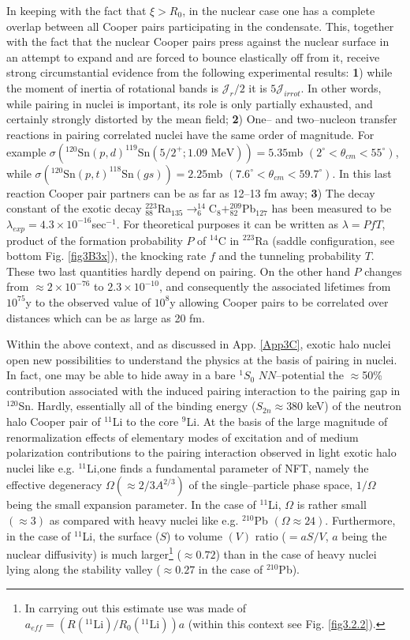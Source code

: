 \begin{subappendices}
 
 In keeping with the fact that $\xi>R_0$, in the nuclear case one has a complete overlap between all Cooper pairs participating in the condensate. This, together with the fact that the nuclear Cooper pairs press against the nuclear surface in an attempt to expand and are forced to bounce elastically off from  it, receive strong circumstantial evidence from the following experimental results: \textbf{1}) while the moment of inertia of rotational bands is $\mathcal J_r/2$ it is $5 \mathcal J_{irrot}$. In other words, while pairing in nuclei is important, its role is only partially exhausted, and certainly strongly distorted by the mean field; \textbf{2}) One-- and two--nucleon transfer reactions in pairing correlated nuclei have the same order of magnitude. For example $\sigma (^{120}\text{Sn}(p,d)^{119}\text{Sn}(5/2^+; 1.09 \text{ MeV}))=5.35 $mb $(2^\circ<\theta_{cm}<55^\circ)$, while $\sigma (^{120}\text{Sn}(p,t)^{118}\text{Sn}(gs))=2.25 $mb $(7.6^\circ<\theta_{cm}<59.7^\circ)$. In this last reaction Cooper pair partners can be as far as 12--13 fm away; \textbf{3}) The decay constant of the exotic decay $^{223}_{88}$Ra$_{135}\rightarrow^{14}_6$C$_8+^{209}_{82}$Pb$_{127}$ has been measured to be $\lambda_{exp}=4.3\times10^{-16}$sec$^{-1}$. For theoretical purposes it can be written as $\lambda=PfT$, product of the formation probability $P$ of $^{14}$C in $^{223}$Ra (saddle configuration, see bottom Fig. \ref{fig3B3x}), the knocking rate $f$ and the tunneling probability $T$. These two last quantities hardly depend on pairing. On the other hand $P$ changes from $\approx 2\times10^{-76}$ to $2.3\times10^{-10}$, and consequently the associated lifetimes from $10^{75}$y to the observed value of $10^8$y  allowing Cooper pairs to be correlated over distances which can be as large as 20 fm.
 
 
 Within the above context, and as discussed in App. \ref{App3C}, exotic halo nuclei open new possibilities to understand the physics at the basis of pairing in nuclei. In fact, one may be able to hide away in a bare $^1S_0$ $NN$--potential the $\approx$50\% contribution associated with the induced pairing interaction to the pairing gap in $^{120}$Sn. Hardly, essentially all of the binding energy ($S_{2n}\approx380$ keV) of the neutron halo Cooper pair of $^{11}$Li to the core $^{9}$Li. At the basis of the large magnitude of renormalization effects of elementary modes of excitation and of medium polarization contributions to the pairing interaction observed in light exotic halo nuclei like e.g. $^{11}$Li,one finds a fundamental parameter of NFT, namely the effective degeneracy $\Omega(\approx2/3A^{2/3})$ of the single--particle phase space, $1/\Omega$ being the small expansion parameter. In the case of $^{11}$Li, $\Omega$ is rather small $(\approx3)$ as compared with heavy nuclei like e.g. $^{210}$Pb $(\Omega\approx24)$. Furthermore, in the case of $^{11}$Li, the surface ($S$) to volume $(V)$ ratio ($=aS/V$, $a$ being the nuclear diffusivity) is much larger\footnote{In carrying out this estimate use was made of $a_{eff}=\left(R(^{11}\text{Li})/R_0(^{11}\text{Li})\right)a$ (within this context see Fig. \ref{fig3.2.2}).} ($\approx0.72$) than in the case of heavy nuclei lying along the stability valley ($\approx0.27$ in the case of $^{210}$Pb).

\end{subappendices}
